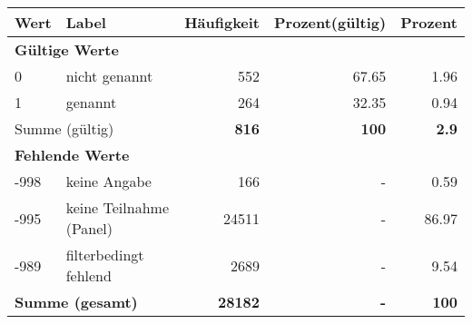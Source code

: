      \begin{longtable}{lXrrr}
     \toprule
     \textbf{Wert} & \textbf{Label} & \textbf{Häufigkeit} & \textbf{Prozent(gültig)} & \textbf{Prozent} \\
     \endhead
     \midrule
     \multicolumn{5}{l}{\textbf{Gültige Werte}}\\

     0 &
     \multicolumn{1}{X}{ nicht genannt   } &


       \num{552} &
       \num[round-mode=places,round-precision=2]{67.65} &
         \num[round-mode=places,round-precision=2]{1.96} \\

     1 &
     \multicolumn{1}{X}{ genannt   } &


       \num{264} &
       \num[round-mode=places,round-precision=2]{32.35} &
         \num[round-mode=places,round-precision=2]{0.94} \\
     \midrule
     \multicolumn{2}{l}{Summe (gültig)} &
       \textbf{\num{816}} &
     \textbf{100} &
       \textbf{\num[round-mode=places,round-precision=2]{2.9}} \\
     \multicolumn{5}{l}{\textbf{Fehlende Werte}}\\
       -998 &
       keine Angabe &
         \num{166} &
        - &
         \num[round-mode=places,round-precision=2]{0.59} \\
       -995 &
       keine Teilnahme (Panel) &
         \num{24511} &
        - &
         \num[round-mode=places,round-precision=2]{86.97} \\
       -989 &
       filterbedingt fehlend &
         \num{2689} &
        - &
         \num[round-mode=places,round-precision=2]{9.54} \\
     \midrule
     \multicolumn{2}{l}{\textbf{Summe (gesamt)}} &
          \textbf{\num{28182}} &
        \textbf{-} &
        \textbf{100} \\
     \bottomrule
     \end{longtable}
     
